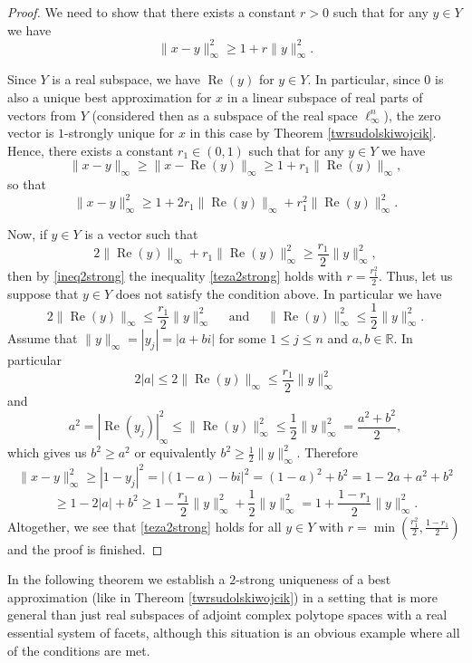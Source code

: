 \documentclass[12pt, reqno]{amsart}
\theoremstyle{definition}
\theoremstyle{remark}
\numberwithin{equation}{section}
\DeclareMathOperator{\re}{Re}
\begin{document}
\begin{proof}
We need to show that there exists a constant $r>0$ such that for any $y \in Y$ we have
\begin{equation}
\label{teza2strong}
\|x-y\|^2_{\infty} \geq 1 + r \|y\|_{\infty}^2.
\end{equation}

Since $Y$ is a real subspace, we have $\re(y)$ for $y \in Y$. In particular, since $0$ is also a unique best approximation for $x$ in a linear subspace of real parts of vectors from $Y$ (considered then as a subspace of the real space $\ell_{\infty}^n$), the zero vector is $1$-strongly unique for $x$ in this case by Theorem \ref{twrsudolskiwojcik}. Hence, there exists a constant $r_1 \in \left (0, 1 \right )$ such that for any $y \in Y$ we have
$$\|x-y\|_{\infty} \geq \|x-\re(y)\|_{\infty} \geq 1+ r_1\|\re(y)\|_{\infty},$$
so that
\begin{equation}
\label{ineq2strong}
\|x-y\|_{\infty}^2 \geq 1 + 2r_1\|\re(y)\|_{\infty}+ r_1^2\|\re(y)\|_{\infty}^2.
\end{equation}

Now, if $y \in Y$ is a vector such that
$$2 \|\re(y)\|_{\infty} + r_1 \|\re(y)\|_{\infty}^2 \geq \frac{r_1}{2} \|y\|_{\infty}^2,$$
then by \eqref{ineq2strong} the inequality \eqref{teza2strong} holds with $r = \frac{r_1^2}{2}$. Thus, let us suppose that $y \in Y$ does not satisfy the condition above. In particular we have
$$2 \|\re(y)\|_{\infty} \leq \frac{r_1}{2} \|y\|_{\infty}^2\quad \text{ and } \quad \|\re(y)\|_{\infty}^2 \leq \frac{1}{2} \|y\|_{\infty}^2.$$
Assume that $\|y\|_{\infty}=|y_j|=|a+bi|$ for some $1 \leq j \leq n$ and $a, b \in \mathbb{R}$. In particular
$$2|a| \leq 2 \|\re(y)\|_{\infty} \leq \frac{r_1}{2} \|y\|_{\infty}^2$$
and
$$a^2=|\re(y_j)|_{\infty}^2 \leq \|\re(y)\|_{\infty}^2 \leq \frac{1}{2} \|y\|_{\infty}^2 = \frac{a^2+b^2}{2},$$
which gives us $b^2 \geq a^2$ or equivalently $b^2 \geq \frac{1}{2} \|y\|_{\infty}^2$. Therefore
$$\|x-y\|_{\infty}^2 \geq |1-y_j|^2= |(1-a) - bi|^2 = (1-a)^2 + b^2 = 1 - 2a + a^2 + b^2$$
$$\geq 1 - 2|a| + b^2 \geq 1 - \frac{r_1}{2} \|y\|_{\infty}^2 + \frac{1}{2} \|y\|_{\infty}^2 = 1 + \frac{1-r_1}{2} \|y\|_{\infty}^2.$$
Altogether, we see that \eqref{teza2strong} holds for all $y \in Y$ with $r = \min \left ( \frac{r_1^2}{2}, \frac{1-r_1}{2} \right )$ and the proof is finished.
\end{proof}



In the following theorem we establish a $2$-strong uniqueness of a best approximation (like in Thereom \ref{twrsudolskiwojcik}) in a setting that is more general than just real subspaces of adjoint complex polytope spaces with a real essential system of facets, although this situation is an obvious example where all of the conditions are met.
\end{document}
